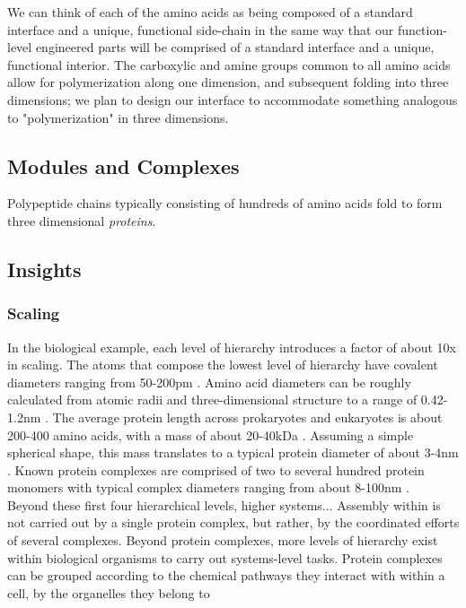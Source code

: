 {We can think of each of the amino acids as being composed of a standard interface and a unique, functional side-chain in the same way that our function-level engineered parts will be comprised of a standard interface and a unique, functional interior.  The carboxylic and amine groups common to all amino acids allow for polymerization along one dimension, and subsequent folding into three dimensions; we plan to design our interface to accommodate something analogous to "polymerization" in three dimensions.\\

 \subsection{Modules and Complexes}

Polypeptide chains typically consisting of hundreds of amino acids fold to form three dimensional \textit{proteins}.  

\subsection{Insights}

\subsubsection{Scaling}

In the biological example, each level of hierarchy introduces a factor of about 10x in scaling.  The atoms that compose the lowest level of hierarchy have covalent diameters ranging from 50-200pm \cite{Slater1993}.  Amino acid diameters can be roughly calculated from atomic radii and three-dimensional structure to a range of 0.42-1.2nm \cite{Pool2003}.  The average protein length across prokaryotes and eukaryotes is about 200-400 amino acids, with a mass of about 20-40kDa \cite{Brocchieri2005}.  Assuming a simple spherical shape, this mass translates to a typical protein diameter of about 3-4nm \cite{Erickson2009}.  Known protein complexes are comprised of two to several hundred protein monomers with typical complex diameters ranging from about 8-100nm \cite{Yang2010a}.\\

Beyond these first four hierarchical levels, higher systems...
Assembly within is not carried out by a single protein complex, but rather, by the coordinated efforts of several complexes.
Beyond protein complexes, more levels of hierarchy exist within biological organisms to carry out systems-level tasks.  Protein complexes can be grouped according to the chemical pathways they interact with within a cell, by the organelles they belong to                                                                                                                                                                                                 

}
